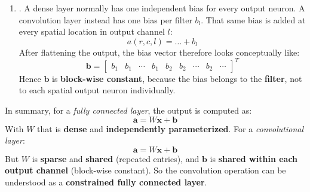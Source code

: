 \begin{enumerate}
    
    \item {}. A dense layer normally has one independent bias for every output neuron. A convolution layer instead has one bias per filter $b_{l}$. That same bias is added at every spatial location in output channel $l$:
    \begin{equation*}
        a(r, c, l) = \dots + b_l
    \end{equation*}
    After flattening the output, the bias vector therefore looks conceptually like:
    \begin{equation*}
        \mathbf{b} = \begin{bmatrix}
            b_1 & b_1 & \cdots & b_1 & b_2 & b_2 & \cdots & b_2 & \cdots
        \end{bmatrix}^{T}
    \end{equation*}
    Hence $\mathbf{b}$ is \textbf{block-wise constant}, because the bias belongs to the \textbf{filter}, not to each spatial output neuron individually.
\end{enumerate}
In summary, for a \emph{fully connected layer}, the output is computed as:
\begin{equation*}
    \mathbf{a} = W\mathbf{x} + \mathbf{b}
\end{equation*}
With $W$ that is \textbf{dense} and \textbf{independently parameterized}. For a \emph{convolutional layer}:
\begin{equation*}
    \mathbf{a} = W\mathbf{x} + \mathbf{b}
\end{equation*}
But $W$ is \textbf{sparse} and \textbf{shared} (repeated entries), and $\mathbf{b}$ is \textbf{shared within each output channel} (block-wise constant). So the convolution operation can be understood as a \textbf{constrained fully connected layer}.